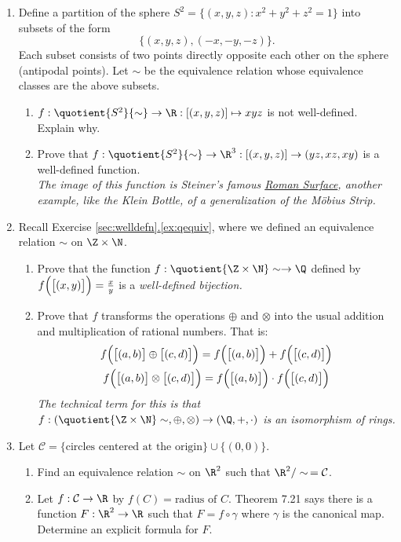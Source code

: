 \begin{enumerate}
	\item Define a partition of the sphere $S^2=\bigl\{(x,y,z):x^2+y^2+z^2=1\bigr\}$ into subsets of the form
	\[\bigl\{(x,y,z),(-x,-y,-z)\bigr\}.\]
	Each subset consists of two points directly opposite each other on the sphere (antipodal points). Let $\sim$ be the equivalence relation whose equivalence classes are the above subsets.
		\begin{enumerate}
	  	\item $f:\quotient{S^2}{\sim}\to\R:[(x,y,z)]\mapsto xyz$ is not well-defined. Explain why.
	  	\item Prove that $f:\quotient{S^2}{\sim}\to\R^3:[(x,y,z)]\to(yz,xz,xy)$ is a well-defined function.\\
			\emph{The image of this function is Steiner's famous \href{http://en.wikipedia.org/wiki/Roman_surface}{Roman Surface}, another example, like the Klein Bottle, of a generalization of the M\"obius Strip.}
		\end{enumerate}
		
		\item Recall Exercise \hyperref[ex:qequiv]{\ref*{sec:welldefn}.\ref*{ex:qequiv}}, where we defined an equivalence relation $\sim$ on $\Z\times\N$.
		\begin{enumerate}
			\item	Prove that the function $f:\quotient{\Z\times\N}\sim\to\Q$ defined by $f\Bigl(\bigl[(x,y)\bigr]\Bigr)=\frac xy$ is a \emph{well-defined bijection.}
			\item Prove that $f$ transforms the operations $\oplus$ and $\otimes$ into the usual addition and multiplication of rational numbers. That is:
			\begin{gather*}
			f\Bigl(\bigl[(a,b)\bigr]\oplus\bigl[(c,d)\bigr]\Bigr)=f\Bigl(\bigl[(a,b)\bigr]\Bigr)+f\Bigl(\bigl[(c,d)\bigr]\Bigr)\\
			f\Bigl(\bigl[(a,b)\bigr]\otimes\bigl[(c,d)\bigr]\Bigr)=f\Bigl(\bigl[(a,b)\bigr]\Bigr)\cdot f\Bigl(\bigl[(c,d)\bigr]\Bigr)
			\end{gather*}
			\emph{The technical term for this is that $f:\left(\quotient{\Z\times\N}\sim,\oplus,\otimes\right)\to(\Q,+,\cdot)$ is an isomorphism of rings.}
		\end{enumerate}
		
		\item Let $\mathcal{C} = \{\text{circles centered at the origin}\} \cup \{(0,0)\}$.
\begin{enumerate}
    \item Find an equivalence relation $\sim$ on $\R^2$ such that $\R^2/\sim \, = \mathcal{C}$.
    \item Let $f : \mathcal{C} \to \R$ by $f(C) = \text{radius of } C$. Theorem 7.21 says there is a function $F : \R^2 \to \R$ such that $F = f \circ \gamma$ where $\gamma$ is the canonical map. Determine an explicit formula for $F$.
\end{enumerate}


\end{enumerate}
